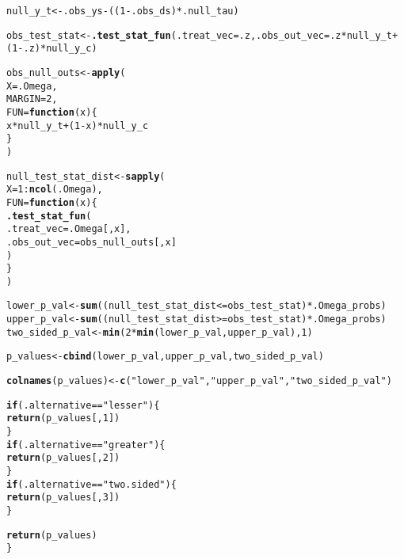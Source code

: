 \documentclass[11pt,leqno]{article}\usepackage[]{graphicx}\usepackage[]{color}
\makeatletter
\newcommand{\hlnum}[1]{\textcolor[rgb]{0.686,0.059,0.569}{#1}}%
\newcommand{\hlstr}[1]{\textcolor[rgb]{0.192,0.494,0.8}{#1}}%
\newcommand{\hlopt}[1]{\textcolor[rgb]{0,0,0}{#1}}%
\newcommand{\hlstd}[1]{\textcolor[rgb]{0.345,0.345,0.345}{#1}}%
\newcommand{\hlkwa}[1]{\textcolor[rgb]{0.161,0.373,0.58}{\textbf{#1}}}%
\newcommand{\hlkwb}[1]{\textcolor[rgb]{0.69,0.353,0.396}{#1}}%
\newcommand{\hlkwc}[1]{\textcolor[rgb]{0.333,0.667,0.333}{#1}}%
\newcommand{\hlkwd}[1]{\textcolor[rgb]{0.737,0.353,0.396}{\textbf{#1}}}%
\newenvironment{kframe}{%
 \def\at@end@of@kframe{}%
 \ifinner\ifhmode%
  \def\at@end@of@kframe{\end{minipage}}%
  \begin{minipage}{\columnwidth}%
 \fi\fi%
 \def\FrameCommand##1{\hskip\@totalleftmargin \hskip-\fboxsep
 \colorbox{shadecolor}{##1}\hskip-\fboxsep
     \hskip-\linewidth \hskip-\@totalleftmargin \hskip\columnwidth}%
 \MakeFramed {\advance\hsize-\width
   \@totalleftmargin\z@ \linewidth\hsize
   \@setminipage}}%
 {\par\unskip\endMakeFramed%
 \at@end@of@kframe}
\newenvironment{knitrout}{}{} %
\theoremstyle{newstyle}
\makeatother
\begin{document}
\begin{knitrout}
\begin{kframe}
\begin{alltt}
  \hlstd{null_y_t} \hlkwb{<-} \hlstd{.obs_ys} \hlopt{-} \hlstd{((}\hlnum{1} \hlopt{-} \hlstd{.obs_ds)} \hlopt{*} \hlstd{.null_tau)}

  \hlstd{obs_test_stat} \hlkwb{<-} \hlkwd{.test_stat_fun}\hlstd{(}\hlkwc{.treat_vec} \hlstd{= .z,} \hlkwc{.obs_out_vec} \hlstd{= .z} \hlopt{*} \hlstd{null_y_t} \hlopt{+} \hlstd{(}\hlnum{1} \hlopt{-} \hlstd{.z)} \hlopt{*} \hlstd{null_y_c)}

  \hlstd{obs_null_outs} \hlkwb{<-} \hlkwd{apply}\hlstd{(}
    \hlkwc{X} \hlstd{= .Omega,}
    \hlkwc{MARGIN} \hlstd{=} \hlnum{2}\hlstd{,}
    \hlkwc{FUN} \hlstd{=} \hlkwa{function}\hlstd{(}\hlkwc{x}\hlstd{) \{}
      \hlstd{x} \hlopt{*} \hlstd{null_y_t} \hlopt{+} \hlstd{(}\hlnum{1} \hlopt{-} \hlstd{x)} \hlopt{*} \hlstd{null_y_c}
    \hlstd{\}}
  \hlstd{)}

  \hlstd{null_test_stat_dist} \hlkwb{<-} \hlkwd{sapply}\hlstd{(}
    \hlkwc{X} \hlstd{=} \hlnum{1}\hlopt{:}\hlkwd{ncol}\hlstd{(.Omega),}
    \hlkwc{FUN} \hlstd{=} \hlkwa{function}\hlstd{(}\hlkwc{x}\hlstd{) \{}
      \hlkwd{.test_stat_fun}\hlstd{(}
        \hlkwc{.treat_vec} \hlstd{= .Omega[, x],}
        \hlkwc{.obs_out_vec} \hlstd{= obs_null_outs[, x]}
      \hlstd{)}
    \hlstd{\}}
  \hlstd{)}

  \hlstd{lower_p_val} \hlkwb{<-} \hlkwd{sum}\hlstd{((null_test_stat_dist} \hlopt{<=} \hlstd{obs_test_stat)} \hlopt{*} \hlstd{.Omega_probs)}
  \hlstd{upper_p_val} \hlkwb{<-} \hlkwd{sum}\hlstd{((null_test_stat_dist} \hlopt{>=} \hlstd{obs_test_stat)} \hlopt{*} \hlstd{.Omega_probs)}
  \hlstd{two_sided_p_val} \hlkwb{<-} \hlkwd{min}\hlstd{(}\hlnum{2} \hlopt{*} \hlkwd{min}\hlstd{(lower_p_val, upper_p_val),} \hlnum{1}\hlstd{)}

  \hlstd{p_values} \hlkwb{<-} \hlkwd{cbind}\hlstd{(lower_p_val, upper_p_val, two_sided_p_val)}

  \hlkwd{colnames}\hlstd{(p_values)} \hlkwb{<-} \hlkwd{c}\hlstd{(}\hlstr{"lower_p_val"}\hlstd{,} \hlstr{"upper_p_val"}\hlstd{,} \hlstr{"two_sided_p_val"}\hlstd{)}

  \hlkwa{if} \hlstd{(.alternative} \hlopt{==} \hlstr{"lesser"}\hlstd{) \{}
    \hlkwd{return}\hlstd{(p_values[,} \hlnum{1}\hlstd{])}
  \hlstd{\}}
  \hlkwa{if} \hlstd{(.alternative} \hlopt{==} \hlstr{"greater"}\hlstd{) \{}
    \hlkwd{return}\hlstd{(p_values[,} \hlnum{2}\hlstd{])}
  \hlstd{\}}
  \hlkwa{if} \hlstd{(.alternative} \hlopt{==} \hlstr{"two.sided"}\hlstd{) \{}
    \hlkwd{return}\hlstd{(p_values[,} \hlnum{3}\hlstd{])}
  \hlstd{\}}

  \hlkwd{return}\hlstd{(p_values)}
\hlstd{\}}


\end{alltt}
\end{kframe}
\end{knitrout}
\end{document}
